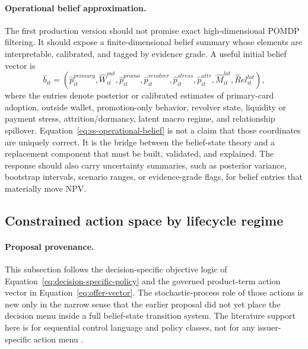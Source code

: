 \documentclass[11pt]{article}
\newcommand{\1}{\mathbf{1}}
\begin{document}
\paragraph{Operational belief approximation.}
The first production version should not promise exact high-dimensional POMDP
filtering. It should expose a finite-dimensional belief summary whose elements
are interpretable, calibrated, and tagged by evidence grade. A useful initial
belief vector is
\begin{equation}
  \widehat b_{it}
  =
  (\widehat p^{primary}_{it},\widehat W^{out}_{it},
   \widehat p^{promo}_{it},\widehat p^{revolver}_{it},
   \widehat p^{stress}_{it},\widehat p^{attr}_{it},
   \widehat M^{lat}_{it},\widehat Rel^{lat}_{it}),
  \label{eq:ss-operational-belief}
\end{equation}
where the entries denote posterior or calibrated estimates of primary-card
adoption, outside wallet, promotion-only behavior, revolver state, liquidity or
payment stress, attrition/dormancy, latent macro regime, and relationship
spillover. Equation~\eqref{eq:ss-operational-belief} is not a claim that those
coordinates are uniquely correct. It is the bridge between the belief-state
theory and a replacement component that must be built, validated, and explained.
The response should also carry uncertainty summaries, such as posterior
variance, bootstrap intervals, scenario ranges, or evidence-grade flags, for
belief entries that materially move NPV.

\subsection{Constrained action space by lifecycle regime}
\label{subsec:state-space-action-space}

\paragraph{Proposal provenance.}
This subsection follows the decision-specific objective logic of
Equation~\eqref{eq:decision-specific-policy} and the governed product-term
action vector in Equation~\eqref{eq:offer-vector}. The stochastic-process role
of those actions is new only in the narrow sense that the earlier proposal did
not yet place the decision menu inside a full belief-state transition system.
The literature support here is for sequential control language and policy
classes, not for any issuer-specific action menu
\citep{puterman1994mdp,murphy2003dynamic,trench2003bankone}.
\end{document}
